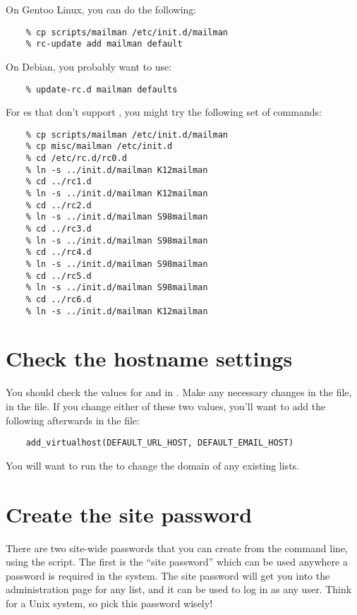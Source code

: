 \documentclass{howto}
\begin{document}
On Gentoo Linux, you can do the following:

\begin{verbatim}
    % cp scripts/mailman /etc/init.d/mailman
    % rc-update add mailman default
\end{verbatim}

On Debian, you probably want to use:

\begin{verbatim}
    % update-rc.d mailman defaults
\end{verbatim}

For \UNIX{}es that don't support , you might try the
following set of commands:

\begin{verbatim}
    % cp scripts/mailman /etc/init.d/mailman
    % cp misc/mailman /etc/init.d
    % cd /etc/rc.d/rc0.d
    % ln -s ../init.d/mailman K12mailman
    % cd ../rc1.d
    % ln -s ../init.d/mailman K12mailman
    % cd ../rc2.d
    % ln -s ../init.d/mailman S98mailman
    % cd ../rc3.d
    % ln -s ../init.d/mailman S98mailman
    % cd ../rc4.d
    % ln -s ../init.d/mailman S98mailman
    % cd ../rc5.d
    % ln -s ../init.d/mailman S98mailman
    % cd ../rc6.d
    % ln -s ../init.d/mailman K12mailman
\end{verbatim}

\section{Check the hostname settings}

You should check the values for  and
 in .  Make any necessary changes in
the  file,  in the  file.  If you
change either of these two values, you'll want to add the following afterwards
in the  file:

\begin{verbatim}
    add_virtualhost(DEFAULT_URL_HOST, DEFAULT_EMAIL_HOST)
\end{verbatim}

You will want to run the  to change the domain of any
existing lists.

\section{Create the site password}

There are two site-wide passwords that you can create from the command line,
using the  script.  The first is the ``site password''
which can be used anywhere a password is required in the system.  The site
password will get you into the administration page for any list, and it can be
used to log in as any user.  Think  for a Unix system, so pick this
password wisely!
\end{document}

